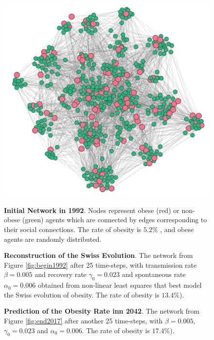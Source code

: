 \documentclass[11pt]{article}
\begin{document}
\begin{figure}[!htb]
\begin{minipage}{.3\linewidth}
\end{minipage}%
\hfill%
\begin{minipage}{.3\linewidth}
    \centering
    \includegraphics[width=\linewidth]{figures/end2042.png}
\end{minipage}%
\hfill%
\begin{minipage}[t]{.3\linewidth}
    \caption{\label{fig:begin1992} \textbf{Initial Network in 1992}. Nodes represent obese (red) or non-obese (green) agents which are connected by edges corresponding to their social connections. The rate of obesity is \(5.2\%\) \cite{bmistatistics}, and obese agents are randomly distributed.}
\end{minipage}%
\hfill%
\begin{minipage}[t]{.3\linewidth}
    \caption{\label{fig:end2017} \textbf{Reconstruction of the Swiss Evolution}. The network from Figure \ref{fig:begin1992} after 25 time-steps, with transmission rate $\beta = 0.005 $ and recovery rate $\gamma_0 = 0.023$ and spontaneous rate $\alpha_0 = 0.006$ obtained from non-linear least squares that best model the Swiss evolution of obesity. The rate of obesity is \(13.4\%\)).}
\end{minipage}%
\hfill%
\begin{minipage}[t]{.3\linewidth}
    \caption{\label{fig:end2042} \textbf{Prediction of the Obesity Rate inn 2042}. The network from Figure \ref{fig:end2017} after another 25 time-steps, with $\beta = 0.005 $, $\gamma_0 = 0.023$ and $\alpha_0 = 0.006$. The rate of obesity is \(17.4\%\)).}
\end{minipage}%
\end{figure}
\end{document}
